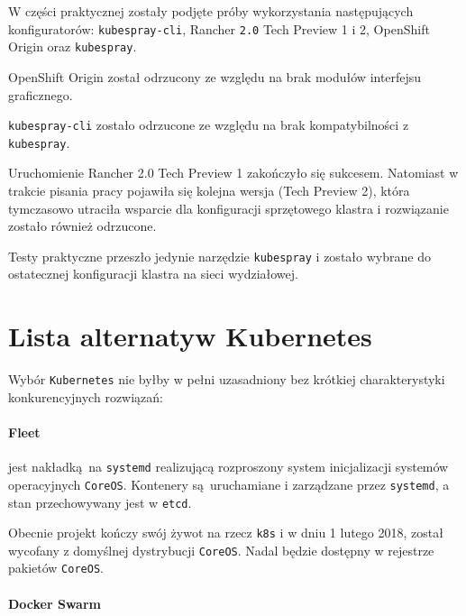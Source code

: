 \documentclass[a4paper,12pt,twoside,openany]{report}
\newcommand{\passthrough}[1]{#1}
\begin{document}
W części praktycznej zostały podjęte próby wykorzystania następujących
konfiguratorów: \passthrough{\lstinline!kubespray-cli!}, Rancher
\passthrough{\lstinline!2.0!} Tech Preview 1 i 2, OpenShift Origin oraz
\passthrough{\lstinline!kubespray!}.

OpenShift Origin został odrzucony ze względu na brak modułów interfejsu
graficznego.

\passthrough{\lstinline!kubespray-cli!} zostało odrzucone ze względu na
brak kompatybilności z \passthrough{\lstinline!kubespray!}.

Uruchomienie Rancher 2.0 Tech Preview 1 zakończyło się sukcesem.
Natomiast w trakcie pisania pracy pojawiła się kolejna wersja (Tech
Preview 2), która tymczasowo utraciła wsparcie dla konfiguracji
sprzętowego klastra i rozwiązanie zostało również odrzucone.

Testy praktyczne przeszło jedynie narzędzie
\passthrough{\lstinline!kubespray!} i zostało wybrane do ostatecznej
konfiguracji klastra na sieci wydziałowej.

\hypertarget{lista-alternatyw-kubernetes}{%
\section{Lista alternatyw
Kubernetes}\label{lista-alternatyw-kubernetes}}

Wybór \passthrough{\lstinline!Kubernetes!} nie byłby w pełni uzasadniony
bez krótkiej charakterystyki konkurencyjnych rozwiązań:

\hypertarget{fleet}{%
\paragraph{Fleet}\label{fleet}}

jest nakładką~na \passthrough{\lstinline!systemd!} realizującą
rozproszony system inicjalizacji systemów operacyjnych
\passthrough{\lstinline!CoreOS!}. Kontenery są~uruchamiane i zarządzane
przez \passthrough{\lstinline!systemd!}, a stan przechowywany jest w
\passthrough{\lstinline!etcd!}.

Obecnie projekt kończy swój żywot na rzecz \passthrough{\lstinline!k8s!}
i w dniu 1 lutego 2018, został wycofany z domyślnej dystrybucji
\passthrough{\lstinline!CoreOS!}. Nadal będzie dostępny w rejestrze
pakietów \passthrough{\lstinline!CoreOS!}.

\hypertarget{docker-swarm}{%
\paragraph{Docker Swarm}\label{docker-swarm}}
\end{document}
